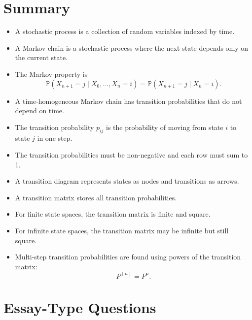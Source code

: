 \documentclass[12pt,a4paper]{article}
\theoremstyle{lecturestyle}
\newcommand{\Prob}{\mathbb{P}}
\begin{document}
\section{Summary}

\begin{itemize}[leftmargin=1.2cm]
    \item A stochastic process is a collection of random variables indexed by time.
    \item A Markov chain is a stochastic process where the next state depends only on the current state.
    \item The Markov property is
    \[
    \Prob(X_{n+1}=j\mid X_0,\ldots,X_n=i)=\Prob(X_{n+1}=j\mid X_n=i).
    \]
    \item A time-homogeneous Markov chain has transition probabilities that do not depend on time.
    \item The transition probability $p_{ij}$ is the probability of moving from state $i$ to state $j$ in one step.
    \item The transition probabilities must be non-negative and each row must sum to 1.
    \item A transition diagram represents states as nodes and transitions as arrows.
    \item A transition matrix stores all transition probabilities.
    \item For finite state spaces, the transition matrix is finite and square.
    \item For infinite state spaces, the transition matrix may be infinite but still square.
    \item Multi-step transition probabilities are found using powers of the transition matrix:
    \[
    P^{(n)}=P^n.
    \]
\end{itemize}

\section{Essay-Type Questions}
\end{document}
